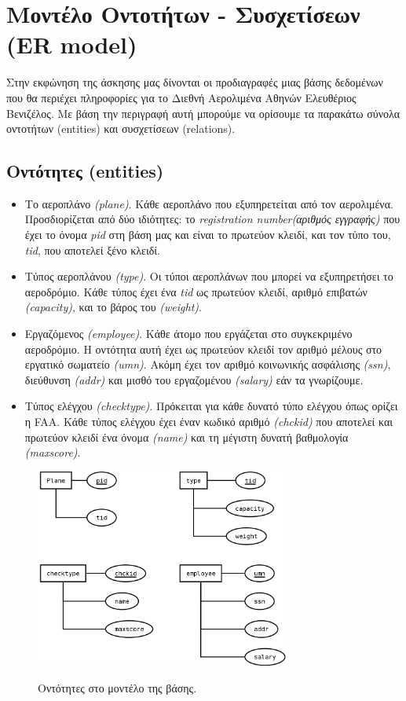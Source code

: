 \documentclass[a4paper]{article}
\begin{document}

\newcommand{\tab}{\hspace*{3em}}

\section{Μοντέλο Οντοτήτων - Συσχετίσεων (ER model)}
Στην εκφώνηση της άσκησης μας δίνονται οι προδιαγραφές μιας βάσης δεδομένων που θα περιέχει
πληροφορίες για το Διεθνή Αερολιμένα Αθηνών Ελευθέριος Βενιζέλος. Με βάση την
περιγραφή αυτή μπορούμε να ορίσουμε τα παρακάτω σύνολα οντοτήτων (entities)
και συσχετίσεων (relations).

\subsection{Οντότητες (entities)}
\begin{itemize}
\item Το αεροπλάνο \emph{(plane)}. Κάθε αεροπλάνο που εξυπηρετείται από τον αερολιμένα.
Προσδιορίζεται από δύο ιδιότητες: το \emph{registration number(αριθμός
εγγραφής)} που έχει το όνομα \emph{pid} στη βάση μας και είναι το πρωτεύον
κλειδί, και τον τύπο του, \emph{tid}, που αποτελεί ξένο κλειδί.
\item Τύπος αεροπλάνου \emph{(type)}. Οι τύποι αεροπλάνων που μπορεί να εξυπηρετήσει το
αεροδρόμιο. Κάθε τύπος έχει ένα \emph{tid} ως πρωτεύον κλειδί, αριθμό επιβατών
\emph{(capacity)}, και το βάρος του \emph{(weight)}.
\item Εργαζόμενος \emph{(employee)}. Κάθε άτομο που εργάζεται στο συγκεκριμένο αεροδρόμιο. Η
οντότητα αυτή έχει ως πρωτεύον κλειδί τον αριθμό μέλους στο εργατικό
σωματείο \emph{(umn)}. Ακόμη έχει τον αριθμό κοινωνικής ασφάλισης \emph{(ssn)},
διεύθυνση \emph{(addr)} και μισθό του εργαζομένου \emph{(salary)} εάν τα γνωρίζουμε.
\item Τύπος ελέγχου \emph{(checktype)}. Πρόκειται για κάθε δυνατό τύπο ελέγχου όπως
ορίζει η FAA. Κάθε τύπος ελέγχου έχει έναν κωδικό αριθμό \emph{(chckid)} που
αποτελεί και πρωτεύον κλειδί ένα όνομα \emph{(name)} και τη μέγιστη δυνατή
βαθμολογία \emph{(maxscore)}.
\end{itemize}
\begin{figure}[h]
\centering
\includegraphics[width=0.75\textwidth]{../../ER_model/aviation_entities.png}\\
\caption{Οντότητες στο μοντέλο της βάσης.}
\end{figure}
\end{document}
